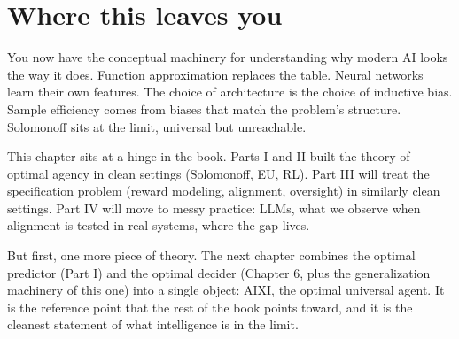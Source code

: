 \section*{Where this leaves you}

You now have the conceptual machinery for understanding why modern AI looks the way it does. Function approximation replaces the table. Neural networks learn their own features. The choice of architecture is the choice of inductive bias. Sample efficiency comes from biases that match the problem's structure. Solomonoff sits at the limit, universal but unreachable.

This chapter sits at a hinge in the book. Parts I and II built the theory of optimal agency in clean settings (Solomonoff, EU, RL). Part III will treat the specification problem (reward modeling, alignment, oversight) in similarly clean settings. Part IV will move to messy practice: LLMs, what we observe when alignment is tested in real systems, where the gap lives.

But first, one more piece of theory. The next chapter combines the optimal predictor (Part I) and the optimal decider (Chapter 6, plus the generalization machinery of this one) into a single object: AIXI, the optimal universal agent. It is the reference point that the rest of the book points toward, and it is the cleanest statement of what intelligence is in the limit.
